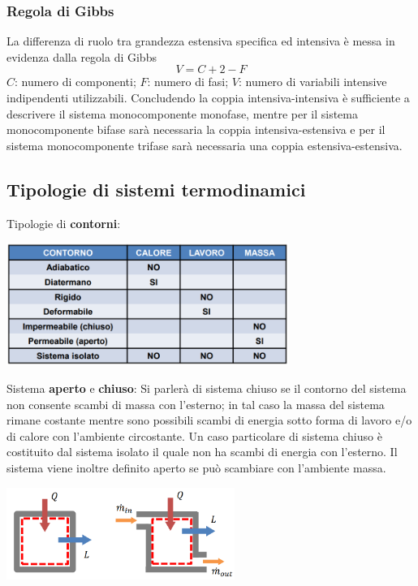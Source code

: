 \subsubsection{Regola di Gibbs}
La differenza di ruolo tra grandezza estensiva specifica ed intensiva è messa in evidenza dalla regola di Gibbs
\[
    V = C+2-F
\]
$C$: numero di componenti;\newline
$F$: numero di fasi;\newline
$V$: numero di variabili intensive indipendenti utilizzabili.\newline
\newline
Concludendo la coppia intensiva-intensiva è sufficiente a descrivere il sistema monocomponente monofase, mentre per il sistema monocomponente bifase sarà necessaria la coppia intensiva-estensiva e per il sistema monocomponente trifase sarà necessaria una coppia estensiva-estensiva. 
\subsection{Tipologie di sistemi termodinamici}
Tipologie di \textbf{contorni}:
\begin{center}
    \includegraphics[height=4cm]{../L01/img2.PNG}
\end{center}
Sistema \textbf{aperto} e \textbf{chiuso}:\newline
Si parlerà di sistema chiuso se il contorno del sistema non consente scambi di massa con l’esterno; in tal caso la massa del sistema rimane costante mentre sono possibili scambi di energia sotto forma di lavoro e/o di calore con l’ambiente circostante. Un caso particolare di sistema chiuso è costituito dal sistema isolato il quale non ha scambi di energia con l’esterno.\newline
Il sistema viene inoltre definito aperto se può scambiare con l'ambiente massa.
\begin{center}
    \includegraphics[height=3cm]{../L01/img3.PNG}
\end{center}
